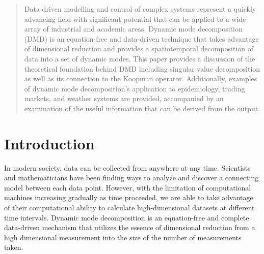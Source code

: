 \documentclass[12pt]{report}
\begin{document}
\renewcommand{\abstractname}{Abstract}
\renewcommand{\abstractnamefont}{\normalfont\Huge\bfseries}
\begin{abstract}
Data-driven modelling and control of complex systems represent a quickly advancing field with significant potential that can be applied to a wide array of industrial and academic areas. Dynamic mode decomposition (DMD) is an equation-free and data-driven technique that takes advantage of dimensional reduction and provides a spatiotemporal decomposition of data into a set of dynamic modes. This paper provides a discussion of the theoretical foundation behind DMD including singular value decomposition as well as its connection to the Koopman operator. Additionally, examples of dynamic mode decomposition's application to epidemiology, trading markets, and weather systems are provided, accompanied by an examination of the useful information that can be derived from the output. 

\end{abstract}

\tableofcontents

\makeatletter
\def\@makechapterhead#1{%
  \vspace*{50\p@}%
  {\parindent \z@ \raggedright \normalfont
    \ifnum \c@secnumdepth >\m@ne
        \huge\bfseries \thechapter.\ %
    \fi
    \interlinepenalty\@M
    #1\par\nobreak%
    \vskip 40\p@%
  }}
\makeatother

\chapter{Introduction}
In modern society, data can be collected from anywhere at any time. Scientists and mathematicians have been finding ways to analyze and discover a connecting model between each data point. However, with the limitation of computational machines increasing gradually as time proceeded, we are able to take advantage of their computational ability to calculate high-dimensional datasets at different time intervals. Dynamic mode decomposition is an equation-free and complete data-driven mechanism that utilizes the essence of dimensional reduction from a high dimensional measurement into the size of the number of measurements taken. 
\end{document}

